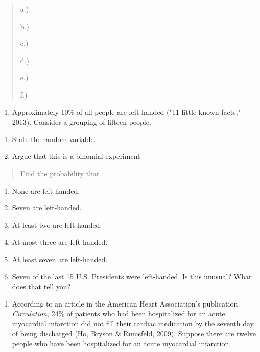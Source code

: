 \documentclass[]{book}
\providecommand{\tightlist}{%
  \setlength{\itemsep}{0pt}\setlength{\parskip}{0pt}}
\begin{document}
\begin{quote}
a.)

b.)

c.)

d.)

e.)

f.)
\end{quote}

\begin{enumerate}
\def\labelenumi{\arabic{enumi}.}
\setcounter{enumi}{6}
\tightlist
\item
  Approximately 10\% of all people are left-handed ("11 little-known
  facts," 2013). Consider a grouping of fifteen people.
\end{enumerate}

\begin{enumerate}
\def\labelenumi{\alph{enumi}.}
\item
  State the random variable.
\item
  Argue that this is a binomial experiment
\end{enumerate}

\begin{quote}
Find the probability that
\end{quote}

\begin{enumerate}
\def\labelenumi{\alph{enumi}.}
\setcounter{enumi}{2}
\item
  None are left-handed.
\item
  Seven are left-handed.
\item
  At least two are left-handed.
\item
  At most three are left-handed.
\item
  At least seven are left-handed.
\item
  Seven of the last 15 U.S. Presidents were left-handed. Is this
  unusual? What does that tell you?
\end{enumerate}

\begin{enumerate}
\def\labelenumi{\arabic{enumi}.}
\setcounter{enumi}{7}
\tightlist
\item
  According to an article in the American Heart Association's
  publication \emph{Circulation}, 24\% of patients who had been hospitalized
  for an acute myocardial infarction did not fill their cardiac
  medication by the seventh day of being discharged (Ho, Bryson \&
  Rumsfeld, 2009). Suppose there are twelve people who have been
  hospitalized for an acute myocardial infarction.
\end{enumerate}
\end{document}
